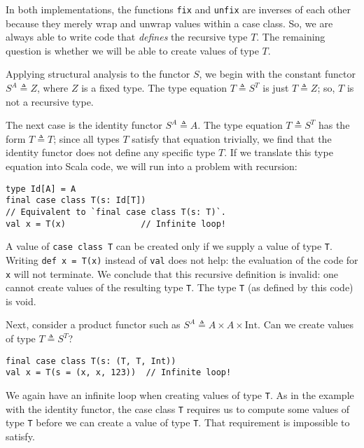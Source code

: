 In both implementations, the functions \lstinline!fix! and \lstinline!unfix!
are inverses of each other because they merely wrap and unwrap values
within a case class. So, we are always able to write code that \emph{defines}
the recursive type $T$. The remaining question is whether we will
be able to create values of type $T$.

Applying structural analysis to the functor $S$, we begin with the
constant functor $S^{A}\triangleq Z$, where $Z$ is a fixed type.
The type equation $T\triangleq S^{T}$ is just $T\triangleq Z$; so,
$T$ is not a recursive type.

The next case is the identity functor $S^{A}\triangleq A$. The type
equation $T\triangleq S^{T}$ has the form $T\triangleq T$; since
all types $T$ satisfy that equation trivially, we find that the identity
functor does not define any specific type $T$. If we translate this
type equation into Scala code, we will run into a problem with recursion:
\begin{lstlisting}
type Id[A] = A
final case class T(s: Id[T])
// Equivalent to `final case class T(s: T)`.
val x = T(x)               // Infinite loop!
\end{lstlisting}
A value of \lstinline!case class T! can be created only if we supply
a value of type \lstinline!T!. Writing \lstinline!def x = T(x)!
instead of \lstinline!val! does not help: the evaluation of the code
for \lstinline!x! will not terminate. We conclude that this recursive
definition is invalid: one cannot create values of the resulting type
\lstinline!T!. The type \lstinline!T! (as defined by this code)
is void.

Next, consider a product functor such as $S^{A}\triangleq A\times A\times\text{Int}$.
Can we create values of type $T\triangleq S^{T}$?
\begin{lstlisting}
final case class T(s: (T, T, Int))
val x = T(s = (x, x, 123))  // Infinite loop!
\end{lstlisting}
We again have an infinite loop when creating values of type \lstinline!T!.
As in the example with the identity functor, the case class \lstinline!T!
requires us to compute some values of type \lstinline!T! before we
can create a value of type \lstinline!T!. That requirement is impossible
to satisfy.

